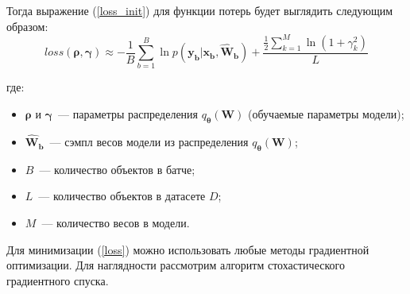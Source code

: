 \documentclass{article}
\numberwithin{equation}{section}
\begin{document}
    Тогда выражение (\ref{loss_init}) для функции потерь будет выглядить следующим образом:
    \begin{equation}\label{loss}
        loss(\pmb{\rho}, \pmb{\gamma})
        \approx
            - \frac{1}{B}
            \sum_{b=1}^{B}
                {\ln{
                    p(\pmb{y_{b}} | \pmb{x_{b}}, \pmb{\hat{W}_{b}})
                }
            }
            +
            \frac
                {
                    \frac{1}{2} \sum_{k=1}^{M} \ln(
                        {1 + \gamma_{k}^{2}}
                    )
                }
                {L}
    \end{equation}

    где:
    \begin{itemize}
        \item $\pmb{\rho}$ и $\pmb{\gamma}$~--- параметры распределения
            $q_{\pmb{\theta}}(\pmb{W})$ (обучаемые параметры модели);
        \item $\pmb{\hat{W}_{b}}$~--- сэмпл весов модели из распределения
            $q_{\pmb{\theta}}(\pmb{W})$;
        \item $B$~--- количество объектов в батче;
        \item $L$~--- количество объектов в датасете $D$;
        \item $M$~--- количество весов в модели.
    \end{itemize}

    Для минимизации (\ref{loss}) можно использовать любые методы градиентной оптимизации.
    Для наглядности рассмотрим алгоритм стохастического градиентного спуска.
\end{document}
